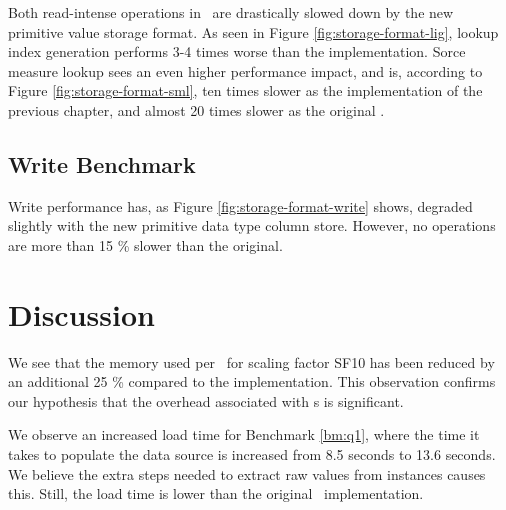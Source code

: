 
Both read-intense operations in \tpchdl~are drastically slowed down by the new primitive value storage format. As seen in Figure \ref{fig:storage-format-lig}, lookup index generation performs 3-4 times worse than the  implementation. Sorce measure lookup sees an even higher performance impact, and is, according to Figure \ref{fig:storage-format-sml}, ten times slower as the implementation of the previous chapter, and almost 20 times slower as the original \gap.

\subsection{Write Benchmark}
\label{sub:Write Benchmark}
Write performance has, as Figure \ref{fig:storage-format-write} shows, degraded slightly with the new primitive data type column store. However, no operations are more than 15 \% slower than the original.

\section{Discussion}
\label{sec:part2-discussion}

We see that the memory used per \lineitem~for scaling factor SF10 has been reduced by an additional 25 \% compared to the  implementation. This observation confirms our hypothesis that the overhead associated with s is significant.

We observe an increased load time for Benchmark \ref{bm:q1}, where the time it takes to populate the data source is increased from 8.5 seconds to 13.6 seconds. We believe the extra steps needed to extract raw values from  instances causes this. Still, the load time is lower than the original \gap~implementation.


